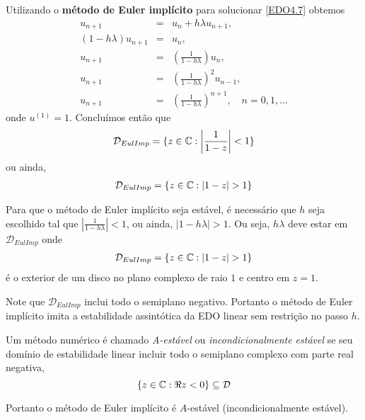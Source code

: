 \begin{ex}
Utilizando o \textbf{método de Euler implícito} para solucionar \eqref{EDO4.7} obtemos
\begin{eqnarray}
 u_{n+1}      &=& u_n+h\lambda u_{n+1}, \\
 (1-h\lambda )u_{n+1} & =& u_n, \\
       u_{n+1} & =& \left(\frac{1}{1- h\lambda }\right)u_n, \\
       u_{n+1} & =& \left(\frac{1}{1- h\lambda }\right)^2u_{n-1}, \\
       u_{n+1} & =& \left(\frac{1}{1- h\lambda }\right)^{n+1}, \quad  n=0,1,\ldots
\end{eqnarray}
onde $u^{(1)}=1$.
Concluímos então que
\begin{eqnarray}
 \mathcal D_{EulImp} = \{z \in  \mathbb{C}:  \left|\frac{1}{1- z}\right|<1\}
\end{eqnarray}
ou ainda,
\begin{eqnarray}
 \mathcal D_{EulImp} = \{z \in  \field{C}:  |1- z|>1\}
\end{eqnarray}

Para que o método de Euler implícito seja estável, é necessário que $h$ seja escolhido tal que $\left|\frac{1}{1- h\lambda }\right|<1$, ou ainda, $|1-h\lambda |>1$. Ou seja, $h\lambda $ deve estar em $\mathcal D_{EulImp}$ onde
\begin{eqnarray}
 \mathcal D_{EulImp} = \{z \in  \field{C}: |1-z|>1\}
\end{eqnarray}
é o exterior de um disco no plano complexo de raio $1$ e centro em $z=1$.

Note que $\mathcal D_{EulImp}$ inclui todo o semiplano negativo. Portanto o método de Euler implícito imita a estabilidade assintótica da EDO linear sem restrição no passo $h$.

\end{ex}

\begin{defn}
Um método numérico é chamado \emph{A-estável} ou \emph{incondicionalmente estável} se seu domínio de estabilidade linear incluir todo o semiplano complexo com parte real negativa,
$$    \{z \in \mathbb{C}: \Re{z}<0\} \subseteq \mathcal D$$
\end{defn}


Portanto o método de Euler implícito é $A$-estável (incondicionalmente estável).





